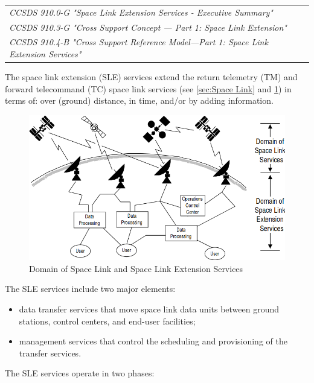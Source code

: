 \begin{tabular}{l}
\textit{CCSDS 910.0-G "Space Link Extension Services - Executive Summary" \cite{CCSDS-910.0-G}} \\
\textit{CCSDS 910.3-G "Cross Support Concept — Part 1:  Space Link Extension" \cite{CCSDS-910.3-G}} \\
\textit{CCSDS 910.4-B "Cross Support Reference Model—Part 1: Space Link Extension Services" \cite{CCSDS-910.4-B}} \\
\end{tabular}

The space link extension (SLE) services extend the return telemetry (TM) and forward telecommand (TC) space link services (see \ref{sec:Space Link} and \ref{fig:Domain of Space Link and Space Link Extension Services}) in terms of: over (ground) distance, in time, and/or by adding information.

\begin{figure}[h]
\centering\includegraphics[scale=0.5]{fig/domains_of_space_link_and_space_link_extension_services}
\caption{Domain of Space Link and Space Link Extension Services}
\label{fig:Domain of Space Link and Space Link Extension Services}
\end{figure}

The SLE services include two major elements:

\begin{itemize}
\item data transfer services that move space link data units between ground stations, control centers, and end-user facilities;
\item management services that control the scheduling and provisioning of the transfer services.
\end{itemize}

The SLE services operate in two phases:

